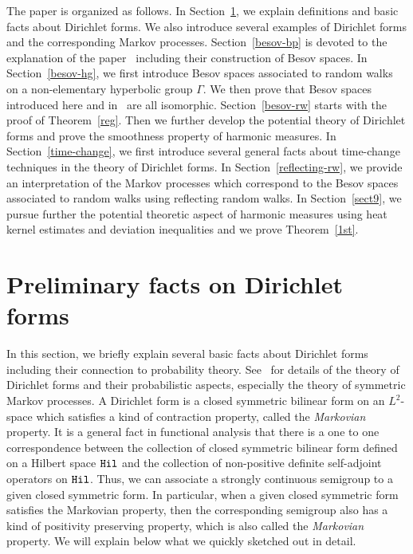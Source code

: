 \documentclass[AHL,Unicode,longabstracts,published]{cedram}
\begin{document}
The paper is organized as follows. In Section~\ref{pre-df}, we explain definitions and basic facts about Dirichlet forms. We also introduce several examples of Dirichlet forms and the corresponding Markov processes. Section~\ref{besov-bp} is devoted to the explanation of the paper~\cite{BP} including their construction of Besov spaces. In Section~\ref{besov-hg}, we first introduce Besov spaces associated to random walks on a non-elementary hyperbolic group $\Gamma$. We then prove that Besov spaces introduced here and in~\cite{BP} are all isomorphic. Section~\ref{besov-rw} starts with the proof of Theorem~\ref{reg}. Then we further develop the potential theory of Dirichlet forms and prove the smoothness property of harmonic measures. In Section~\ref{time-change}, we first introduce several general facts about time-change techniques in the theory of Dirichlet forms. In Section~\ref{reflecting-rw}, we provide an interpretation of the Markov processes which correspond to the Besov spaces associated to random walks using reflecting random walks. In Section~\ref{sect9}, we pursue further the potential theoretic aspect of harmonic measures using heat kernel estimates and deviation inequalities and we prove Theorem~\ref{1st}.



\section{Preliminary facts on Dirichlet forms}\label{pre-df}
In this section, we briefly explain several basic facts about Dirichlet forms including their connection to probability theory. See~\cite{CF,FOT} for details of the theory of Dirichlet forms and their probabilistic aspects, especially the theory of symmetric Markov processes. A Dirichlet form is a closed symmetric bilinear form on an $L^2$-space which satisfies a kind of contraction property, called the \emph{Markovian} property. It is a general fact in functional analysis that there is a one to one correspondence between the collection of closed symmetric bilinear form defined on a Hilbert space ${\tt Hil}$ and the collection of non-positive definite self-adjoint operators on ${\tt Hil}$. Thus, we can associate a strongly continuous semigroup to a given closed symmetric form. In particular, when a given closed symmetric form satisfies the Markovian property, then the corresponding semigroup also has a kind of positivity preserving property, which is also called the \emph{Markovian} property. We will explain below what we quickly sketched out in detail.
\end{document}
